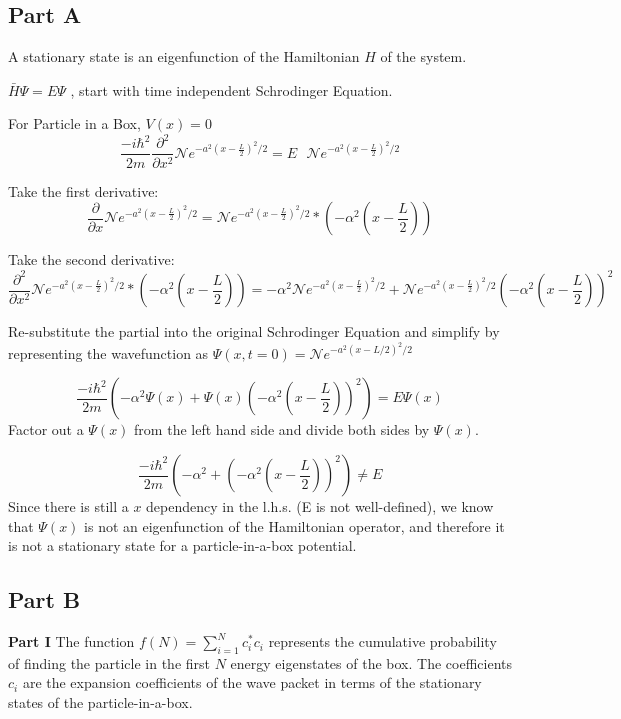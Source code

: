 \documentclass{article}
\begin{document}
\begin{adjustwidth}{5pt}{5pt}

\subsection*{Part A}
 A stationary state is an eigenfunction of the Hamiltonian $H$ of the system.

 $\bar{H} \Psi = E \Psi$ , start with time independent Schrodinger Equation.

 For Particle in a Box, $V(x) = 0$
\[
\frac{-i\hbar^2}{2m} \frac{\partial^2}{\partial x^2} \mathcal{N} e^{-a^2 \left(x - \frac{L}{2}\right)^2 / 2} = E \text{  }\mathcal{N} e^{-a^2 \left(x - \frac{L}{2}\right)^2 / 2}
\]

Take the first derivative:
\[
\frac{\partial}{\partial x}\mathcal{N} e^{-a^2 \left(x - \frac{L}{2}\right)^2 / 2} = \mathcal{N} e^{-a^2 \left(x - \frac{L}{2}\right)^2 / 2} * (-\alpha^2(x- \frac{L}{2}))
\]

Take the second derivative:
\[
\frac{\partial^2}{\partial x^2}\mathcal{N} e^{-a^2 \left(x - \frac{L}{2}\right)^2 / 2} * (-\alpha^2(x- \frac{L}{2})) = -\alpha^2\mathcal{N} e^{-a^2 \left(x - \frac{L}{2}\right)^2 / 2} + \mathcal{N} e^{-a^2 \left(x - \frac{L}{2}\right)^2 / 2}(-\alpha^2(x-\frac{L}{2}))^2
\]

Re-substitute the partial into the original Schrodinger Equation and simplify by representing the wavefunction as $\Psi(x, t = 0) = \mathcal{N} e^{-a^2(x-L/2)^2/2}$

\[
\frac{-i\hbar^2}{2m} \left( -\alpha^2 \Psi(x) + \Psi(x) \left(-\alpha^2 (x - \frac{L}{2})\right)^2 \right) = E \Psi(x)
\]
Factor out a $\Psi(x)$ from the left hand side and divide both sides by $\Psi(x)$.

\[
\frac{-i\hbar^2}{2m} \left( -\alpha^2  + \left(-\alpha^2 (x - \frac{L}{2})\right)^2 \right) \neq E 
\]
Since there is still a $x$ dependency in the l.h.s. (E is not well-defined), we know that $\Psi(x)$ is not an eigenfunction of the Hamiltonian operator, and therefore it is not a stationary state for a particle-in-a-box potential.
\subsection*{Part B}
\noindent \textbf{Part I} The function $f(N) = \sum_{i=1}^N c_i^{*} c_i$ represents the cumulative probability of finding the particle in the first $N$ energy eigenstates of the box. The coefficients $c_i$ are the expansion coefficients of the wave packet in terms of the stationary states of the particle-in-a-box.


\end{adjustwidth}
\end{document}

